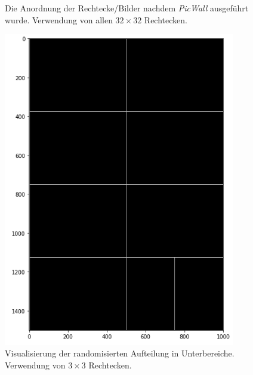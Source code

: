 \documentclass[12pt, ngerman, utf8]{article}
\begin{document}
\begin{figure}[h]
\begin{minipage}{.45\textwidth}
  \caption{Die Anordnung der Rechtecke/Bilder nachdem \textit{PicWall} ausgeführt wurde. Verwendung von allen $32 \times 32$ Rechtecken.}
  \label{fig:picwall-vis}
\end{minipage}
\end{figure}
 
\begin{figure}[h]
\centering
\begin{minipage}{.45\textwidth}
  \centering
  \includegraphics[width=0.9\textwidth]{./imgs/picwall-tree-small.png}
  \caption{Visualisierung der randomisierten Aufteilung in Unterbereiche. Verwendung von $3 \times 3$ Rechtecken.}
  \label{fig:picwall-tree-3}
\end{minipage}%
\hfill
\begin{minipage}{.45\textwidth}
  \centering

\end{minipage}
\end{figure}
\end{document}

